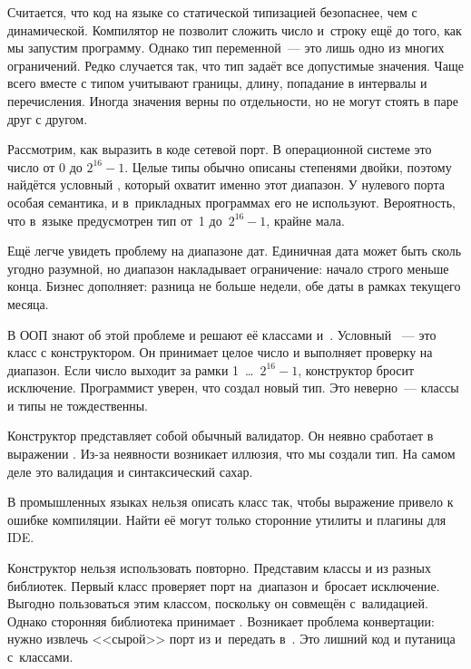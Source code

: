 
Считается, что код на языке со статической типизацией безопаснее, чем с
динамической. Компилятор не позволит сложить число и~строку ещё до того, как
мы запустим программу. Однако тип переменной~--- это лишь одно из многих
ограничений. Редко случается так, что тип задаёт все допустимые
значения. Чаще всего вместе с типом учитывают границы, длину, попадание в
интервалы и перечисления. Иногда значения верны по отдельности, но не могут
стоять в паре друг с другом.


Рассмотрим, как выразить в коде сетевой порт. В операционной системе это число
от 0 до $2^{16}-1$. Целые типы обычно описаны степенями двойки, поэтому найдётся
условный , который охватит именно этот диапазон. У нулевого
порта особая семантика, и в~прикладных программах его не используют.
Вероятность, что в~языке предусмотрен тип от~1 до~$2^{16}-1$, крайне мала.

Ещё легче увидеть проблему на диапазоне дат. Единичная дата может быть сколь
угодно разумной, но диапазон накладывает ограничение: начало строго меньше
конца. Бизнес дополняет: разница не больше недели, обе даты в рамках текущего
месяца.


В ООП знают об этой проблеме и решают её классами 
и~. Условный ~--- это класс с конструктором. Он
принимает целое число и выполняет проверку на диапазон. Если число выходит за
рамки 1~\dots~$2^{16}-1$, конструктор бросит исключение. Программист уверен, что
создал новый тип. Это неверно~--- классы и типы не тождественны.

Конструктор представляет собой обычный валидатор. Он неявно сработает в
выражении . Из-за неявности возникает иллюзия, что мы
создали тип. На самом деле это валидация и синтаксический сахар.


В промышленных языках нельзя описать класс так, чтобы выражение
 привело к ошибке компиляции. Найти её могут
только сторонние утилиты и плагины для IDE.

Конструктор нельзя использовать повторно. Представим классы  и
 из разных библиотек. Первый класс проверяет порт на~диапазон
и~бросает исключение. Выгодно пользоваться этим классом, поскольку он совмещён
с~валидацией. Однако сторонняя библиотека принимает . Возникает
проблема конвертации: нужно извлечь <<сырой>> порт из  и~передать
в~. Это лишний код и путаница с~классами.

